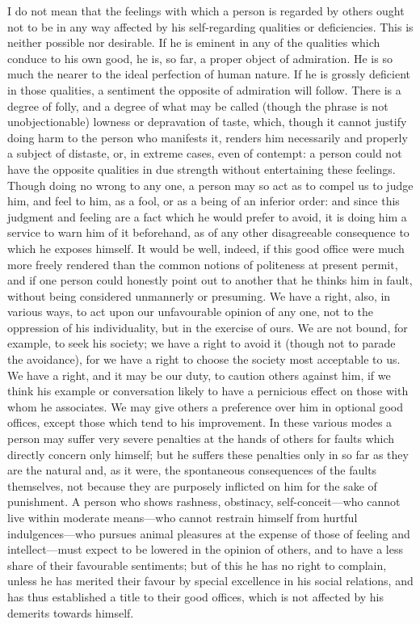 \documentclass[11pt,openany]{book}
\begin{document}
I do not mean that the feelings with which a person is regarded by others ought not to be in any way affected by his self-regarding qualities or deficiencies. This is neither possible nor desirable. If he is eminent in any of the qualities which conduce to his own good, he is, so far, a proper object of admiration. He is so much the nearer to the ideal perfection of human nature. If he is grossly deficient in those qualities, a sentiment the opposite of admiration will follow. There is a degree of folly, and a degree of what may be called (though the phrase is not unobjectionable) lowness or depravation of taste, which, though it cannot justify doing harm to the person who manifests it, renders him necessarily and properly a subject of distaste, or, in extreme cases, even of contempt: a person could not have the opposite qualities in due strength without entertaining these feelings. Though doing no wrong to any one, a person may so act as to compel us to judge him, and feel to him, as a fool, or as a being of an inferior order: and since this judgment and feeling are a fact which he would prefer to avoid, it is doing him a service to warn him of it beforehand, as of any other disagreeable consequence to which he exposes himself. It would be well, indeed, if this good office were much more freely rendered than the common notions of politeness at present permit, and if one person could honestly point out to another that he thinks him in fault, without being considered unmannerly or presuming. We have a right, also, in various ways, to act upon our unfavourable opinion of any one, not to the oppression of his individuality, but in the exercise of ours. We are not bound, for example, to seek his society; we have a right to avoid it (though not to parade the avoidance), for we have a right to choose the society most acceptable to us. We have a right, and it may be our duty, to caution others against him, if we think his example or conversation likely to have a pernicious effect on those with whom he associates. We may give others a preference over him in optional good offices, except those which tend to his improvement. In these various modes a person may suffer very severe penalties at the hands of others for faults which directly concern only himself; but he suffers these penalties only in so far as they are the natural and, as it were, the spontaneous consequences of the faults themselves, not because they are purposely inflicted on him for the sake of punishment. A person who shows rashness, obstinacy, self-conceit---who cannot live within moderate means---who cannot restrain himself from hurtful indulgences---who pursues animal pleasures at the expense of those of feeling and intellect---must expect to be lowered in the opinion of others, and to have a less share of their favourable sentiments; but of this he has no right to complain, unless he has merited their favour by special excellence in his social relations, and has thus established a title to their good offices, which is not affected by his demerits towards himself.
\end{document}
